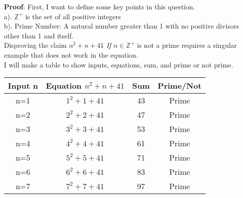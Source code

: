 \documentclass[10pt, AMS Euler]{article}
\newcommand{\Z}{\mathbb{Z}}
\begin{document}
\begin{enumerate}
        \textbf{Proof}: 
First, I want to define some key points in this question. 
\\a). $\Z^{+}$ is the set of all positive integers
\\b). Prime Number: A natural number greater than 1 with no positive divisors other than 1 and itself. 
\\ Disproving the claim \emph{$n^2 + n +41$ If $n \in \Z^+$} is not a prime requires a singular example that does not work in the equation. \\ I will make a table to show inputs, equations, sum, and prime or not prime. \\
\begin{tabular}{|c||c|c|c|}
              \hline
               Input
n& Equation
$n^{2}+n+41$& Sum&Prime/Not\\
              \hline
               n=1& $1^{2}+1+41$& 43&Prime\\
              \hline
               n=2& $2^{2}+2+41$& 47&Prime\\
              \hline
  n=3& $3^{2}+3+41$& 53&Prime\\\hline
  n=4& $4^{2}+4+41$& 61&Prime\\\hline
 n=5& $5^{2}+5+41$& 71&Prime\\\hline
 n=6& $6^{2}+6+41$& 83&Prime\\\hline
 n=7& $7^{2}+7+41$& 97&Prime\\\hline
            \end{tabular}


\end{enumerate}
\end{document}
